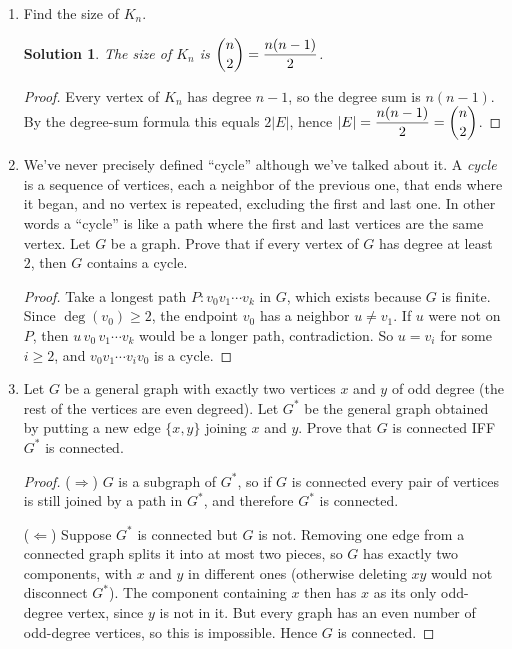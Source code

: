 \documentclass[11pt]{article}
\theoremstyle{solstyle}
\newtheorem*{solution}{Solution}
\begin{document}
\begin{enumerate}[leftmargin=*]
\item Find the size of $K_n$.

\begin{solution}
The size of $K_n$ is $\dbinom{n}{2}=\dfrac{n(n-1)}{2}$.
\end{solution}

\begin{proof}
Every vertex of $K_n$ has degree $n-1$, so the degree sum is $n(n-1)$. By the degree-sum formula this equals $2\lvert E\rvert$, hence $\lvert E\rvert = \dfrac{n(n-1)}{2}=\dbinom{n}{2}$.
\end{proof}

\item We've never precisely defined ``cycle'' although we've talked about it. A \emph{cycle} is a sequence of vertices, each a neighbor of the previous one, that ends where it began, and no vertex is repeated, excluding the first and last one. In other words a ``cycle'' is like a path where the first and last vertices are the same vertex. Let $G$ be a graph. Prove that if every vertex of $G$ has degree at least $2$, then $G$ contains a cycle.

\begin{proof}
Take a longest path $P: v_0 v_1 \cdots v_k$ in $G$, which exists because $G$ is finite. Since $\deg(v_0)\ge 2$, the endpoint $v_0$ has a neighbor $u\ne v_1$. If $u$ were not on $P$, then $u\,v_0\,v_1\cdots v_k$ would be a longer path, contradiction. So $u=v_i$ for some $i\ge 2$, and $v_0 v_1 \cdots v_i v_0$ is a cycle.
\end{proof}

\item Let $G$ be a general graph with exactly two vertices $x$ and $y$ of odd degree (the rest of the vertices are even degreed). Let $G^{*}$ be the general graph obtained by putting a new edge $\{x,y\}$ joining $x$ and $y$. Prove that $G$ is connected IFF $G^{*}$ is connected.

\begin{proof}

($\Rightarrow$) $G$ is a subgraph of $G^{*}$, so if $G$ is connected every pair of vertices is still joined by a path in $G^{*}$, and therefore $G^{*}$ is connected.

($\Leftarrow$) Suppose $G^{*}$ is connected but $G$ is not. Removing one edge from a connected graph splits it into at most two pieces, so $G$ has exactly two components, with $x$ and $y$ in different ones (otherwise deleting $xy$ would not disconnect $G^{*}$). The component containing $x$ then has $x$ as its only odd-degree vertex, since $y$ is not in it. But every graph has an even number of odd-degree vertices, so this is impossible. Hence $G$ is connected.
\end{proof}


\end{enumerate}
\end{document}
